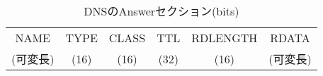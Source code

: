 \begin{table}[htbp]
 \caption{DNSのAnswerセクション(bits)}
 \centering
  \begin{tabular}{|c|c|c|c|c|c|}
    \toprule
		NAME & TYPE & CLASS & TTL & RDLENGTH & RDATA\\
		(可変長) & (16) & (16) & (32) & (16) & (可変長)\\
    \bottomrule
  \end{tabular}
 \label{tab:answer-dns}
\end{table}
